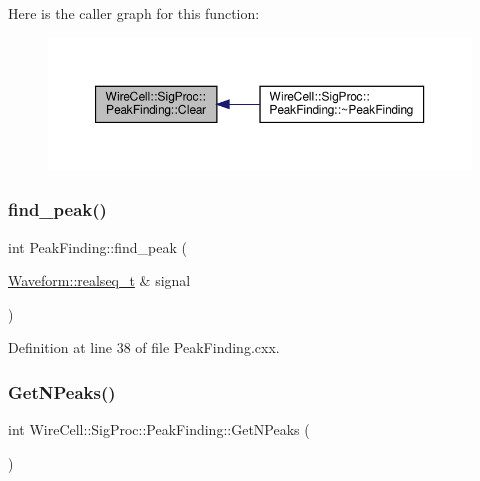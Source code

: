 Here is the caller graph for this function\+:
\nopagebreak
\begin{figure}[H]
\begin{center}
\leavevmode
\includegraphics[width=350pt]{class_wire_cell_1_1_sig_proc_1_1_peak_finding_ab4d567863883d75efc434f8193cd4b6a_icgraph}
\end{center}
\end{figure}
\mbox{\label{class_wire_cell_1_1_sig_proc_1_1_peak_finding_aa66a533f1d774c2c73c9d07744a3d6d1}} 
\subsubsection{\texorpdfstring{find\+\_\+peak()}{find\_peak()}}
{\footnotesize\ttfamily int Peak\+Finding\+::find\+\_\+peak (\begin{DoxyParamCaption}\item[{\hyperlink{namespace_wire_cell_1_1_waveform_a479175e541c8545e87cd8063b74b6956}{Waveform\+::realseq\+\_\+t} \&}]{signal }\end{DoxyParamCaption})}



Definition at line 38 of file Peak\+Finding.\+cxx.

\mbox{\label{class_wire_cell_1_1_sig_proc_1_1_peak_finding_a7266f6b9a28655301cb4b802eb02af76}} 
\subsubsection{\texorpdfstring{Get\+N\+Peaks()}{GetNPeaks()}}
{\footnotesize\ttfamily int Wire\+Cell\+::\+Sig\+Proc\+::\+Peak\+Finding\+::\+Get\+N\+Peaks (\begin{DoxyParamCaption}{ }\end{DoxyParamCaption})\hspace{0.3cm}{\ttfamily [inline]}}



